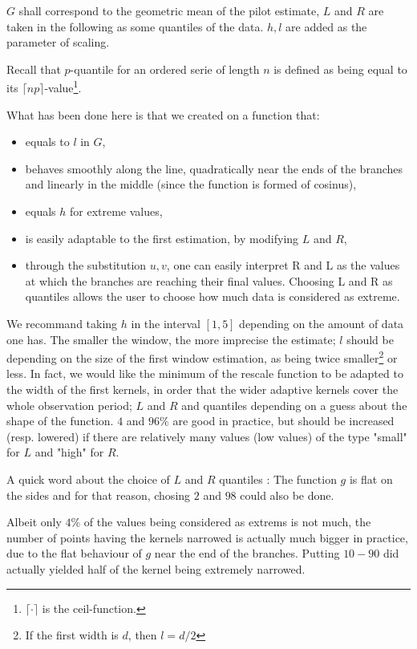 \documentclass[11pt]{book}
\begin{document}
$G$ shall correspond to the geometric mean of the pilot estimate, $L$ and $R$ are taken in the following as some quantiles of the data. $h,l$ are added as the parameter of scaling.

Recall that $p$-quantile for an ordered serie of length $n$ is defined as being equal to its $\lceil{np}\rceil$-value\footnote{$\lceil{\cdot}\rceil$ is the ceil-function.}.


What has been done here is that we created on a function that:



\begin{itemize}
\item equals to $l$ in $G$, 
\item behaves smoothly along the line, quadratically near the ends of the branches and linearly in the middle (since the function is formed of cosinus),
\item equals $h$ for extreme values,
\item is easily adaptable to the first estimation, by modifying $L$ and $R$,
\item through the substitution $u,v$, one can easily interpret R and L as the values at which the branches are reaching their final values. Choosing L and R as quantiles allows the user to choose how much data is considered as extreme. 
\end{itemize}

\begin{remarque}
We recommand taking $h$ in the interval $[1,5]$ depending on the amount of data one has. The smaller the window, the more imprecise the estimate; $l$ should be depending on the size of the first window estimation, as being twice smaller\footnote{If the first width is $d$, then $l = d / 2$} or less. In fact, we would like the minimum of the rescale function to be adapted to the width of the first kernels, in order that the wider adaptive kernels cover the whole observation period; $L$ and $R$ and quantiles depending on a guess about the shape of the function. $4$ and $96 \%$ are good in practice, but should be increased (resp. lowered) if there are relatively many values (low values) of the type "small" for $L$ and "high" for $R$.
\end{remarque}


\begin{remarque}
A quick word about the choice of $L$ and $R$ quantiles : The function $g$ is flat on the sides and for that reason, chosing $2$ and $98$ could also be done. 

Albeit only $4\%$ of the values being considered as extrems is not much, the number of points having the kernels narrowed is actually much bigger in practice, due to the flat behaviour of $g$ near the end of the branches. Putting $10-90$ did actually yielded half of the kernel being extremely narrowed.
\end{remarque}
\end{document}
